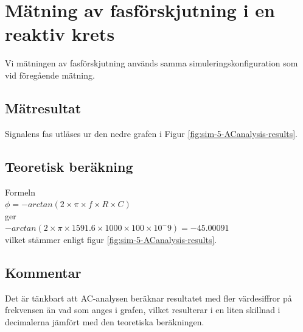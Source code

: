 \documentclass[11pt,a4paper]{article}
\begin{document}
\clearpage

\section{Mätning av fasförskjutning i en reaktiv krets}\label{}
Vi mätningen av fasförskjutning används samma simuleringskonfiguration som vid
föregående mätning.

\subsection{Mätresultat}\label{}
Signalens fas utläses ur den nedre grafen i Figur \ref{fig:sim-5-ACanalysis-results}.

\subsection{Teoretisk beräkning}\label{}
Formeln\\
	$\phi = -arctan(2\times \pi\times f\times R\times C)$\\
ger\\
$ -arctan(2\times \pi\times 1591.6\times 1000\times 100\times 10^-9) = -45.00091$\\
vilket stämmer enligt figur \ref{fig:sim-5-ACanalysis-results}.

\subsection{Kommentar}\label{}
Det är tänkbart att AC-analysen beräknar resultatet med fler värdesiffror på frekvensen än vad som anges i grafen, vilket resulterar i en liten skillnad i decimalerna jämfört med den teoretiska beräkningen.
\clearpage

\end{document}
